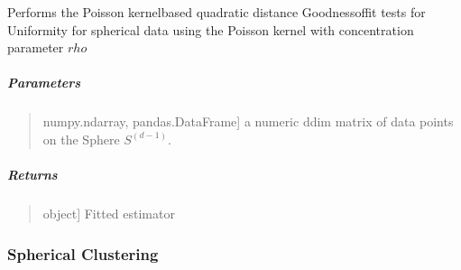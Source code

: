 \documentclass[letterpaper,10pt,english,openany,oneside]{sphinxmanual}
\begin{document}
\begin{fulllineitems}
\label{\detokenize{api_reference/generated/QuadratiK.poisson_kernel_test.PoissonKernelTest:QuadratiK.poisson_kernel_test.PoissonKernelTest.test}}
\pysigstartsignatures
{}
\pysigstopsignatures
\sphinxAtStartPar
Performs the Poisson kernel\sphinxhyphen{}based quadratic distance Goodness\sphinxhyphen{}of\sphinxhyphen{}fit tests for
Uniformity for spherical data using the Poisson kernel with concentration parameter \(rho\)


\subparagraph{Parameters}
\label{\detokenize{api_reference/generated/QuadratiK.poisson_kernel_test.PoissonKernelTest:id3}}\begin{quote}
\begin{description}
\sphinxlineitem{x}{[}numpy.ndarray, pandas.DataFrame{]}
\sphinxAtStartPar
a numeric d\sphinxhyphen{}dim matrix of data points on the Sphere \(S^{(d-1)}\).

\end{description}
\end{quote}


\subparagraph{Returns}
\label{\detokenize{api_reference/generated/QuadratiK.poisson_kernel_test.PoissonKernelTest:id4}}\begin{quote}
\begin{description}
\sphinxlineitem{self}{[}object{]}
\sphinxAtStartPar
Fitted estimator

\end{description}
\end{quote}

\end{fulllineitems}




\subsubsection{Spherical Clustering}
\label{\detokenize{api_reference/index:spherical-clustering}}\label{\detokenize{api_reference/index:module-QuadratiK.spherical_clustering}}
\end{document}
